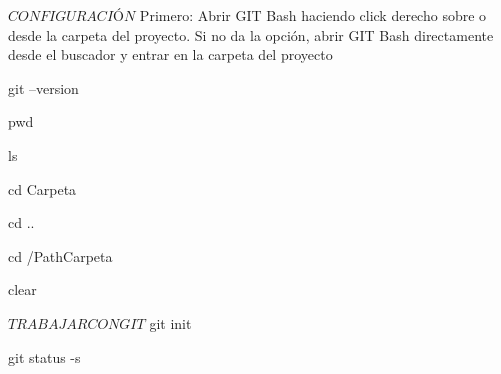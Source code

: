 
$ CONFIGURACIÓN $
Primero: Abrir GIT Bash haciendo click derecho sobre o desde la carpeta del proyecto. Si no da la opción, abrir GIT Bash directamente desde el buscador y entrar en la carpeta del proyecto

	git --version		%

	pwd					%

	ls					%

	cd Carpeta			%

	cd ..				%

	cd /PathCarpeta		%

	clear				%



$ TRABAJAR CON GIT $
	git init		%

	git status -s	%

